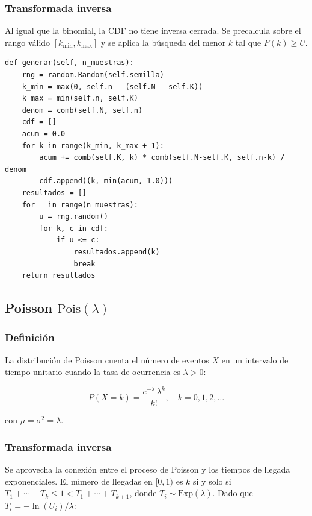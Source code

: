 \documentclass[a4paper, 11pt]{article}
\begin{document}
\subsubsection*{Transformada inversa}

Al igual que la binomial, la CDF no tiene inversa cerrada. Se precalcula sobre
el rango válido $[k_{\min}, k_{\max}]$ y se aplica la búsqueda del menor $k$
tal que $F(k) \geq U$.

\begin{lstlisting}[style=python, caption={Generador Hipergeométrico — transformada inversa.}]
def generar(self, n_muestras):
    rng = random.Random(self.semilla)
    k_min = max(0, self.n - (self.N - self.K))
    k_max = min(self.n, self.K)
    denom = comb(self.N, self.n)
    cdf = []
    acum = 0.0
    for k in range(k_min, k_max + 1):
        acum += comb(self.K, k) * comb(self.N-self.K, self.n-k) / denom
        cdf.append((k, min(acum, 1.0)))
    resultados = []
    for _ in range(n_muestras):
        u = rng.random()
        for k, c in cdf:
            if u <= c:
                resultados.append(k)
                break
    return resultados
\end{lstlisting}


\subsection{Poisson \texorpdfstring{$\mathrm{Pois}(\lambda)$}{Pois(lambda)}}

\subsubsection*{Definición}

La distribución de Poisson cuenta el número de eventos $X$ en un intervalo de
tiempo unitario cuando la tasa de ocurrencia es $\lambda > 0$:

\begin{equation}
  P(X = k) = \frac{e^{-\lambda}\,\lambda^k}{k!}, \quad k = 0,1,2,\ldots
  \label{eq:poisson_pmf}
\end{equation}

con $\mu = \sigma^2 = \lambda$.

\subsubsection*{Transformada inversa}

Se aprovecha la conexión entre el proceso de Poisson y los tiempos de llegada
exponenciales. El número de llegadas en $[0,1)$ es $k$ si y solo si
$T_1+\cdots+T_k \leq 1 < T_1+\cdots+T_{k+1}$, donde $T_i \sim \mathrm{Exp}(\lambda)$.
Dado que $T_i = -\ln(U_i)/\lambda$:
\end{document}
